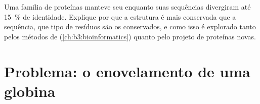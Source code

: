 \begin{exercise}[$\star\star\star$]\label{exo:b3:structural-biology:12}
Uma família de proteínas manteve seu  enquanto suas
sequências divergiram até \qty{15}{\%} de identidade. Explique por que
a estrutura é mais conservada que a sequência, que tipo de resíduos são
os conservados, e como isso é explorado tanto pelos métodos de 
(\cref{ch:b3:bioinformatics}) quanto pelo projeto de proteínas novas.
\end{exercise}

\section{Problema: o enovelamento de uma globina}

